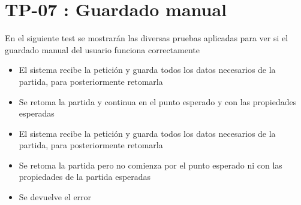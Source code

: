 \section{TP-07 : Guardado manual}\label{sect:TP1}

En el siguiente test se mostrarán las diversas pruebas aplicadas para ver si el guardado manual del usuario funciona correctamente


{
\begin{itemize}
\item El sistema recibe la petición y guarda todos los datos necesarios de la partida, para posteriormente retomarla
\item Se retoma la partida y continua en el punto esperado y con las propiedades esperadas

\end{itemize}}{}

{
\begin{itemize}
\item El sistema recibe la petición y guarda todos los datos necesarios de la partida, para posteriormente retomarla
\item Se retoma la partida pero no comienza por el punto esperado ni con las propiedades de la partida esperadas
\item Se devuelve el error 
\end{itemize}}{}